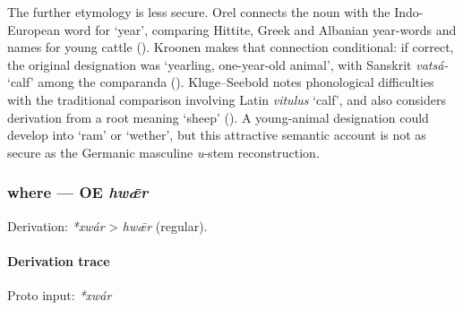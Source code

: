 \documentclass[
  british,
  a4paper,
]{article}
\begin{document}
The further etymology is less secure. Orel connects the noun with the
Indo-European word for `year', comparing Hittite, Greek and Albanian
year-words and names for young cattle (). Kroonen makes that connection conditional: if correct,
the original designation was `yearling, one-year-old animal', with
Sanskrit \emph{vatsá-} `calf' among the comparanda
(). Kluge--Seebold notes
phonological difficulties with the traditional comparison involving
Latin \emph{vitulus} `calf', and also considers derivation from a root
meaning `sheep' ().
A young-animal designation could develop into `ram' or `wether', but
this attractive semantic account is not as secure as the Germanic
masculine \emph{u}-stem reconstruction.

\subsubsection{\texorpdfstring{where --- OE
\emph{hwǣr}}{where --- OE hwǣr}}\label{where-oe-hwux1e3r}

Derivation: \emph{*xwár} \textgreater{} \emph{hwǣr} (regular).

\paragraph{Derivation trace}\label{derivation-trace-97}

Proto input: \emph{*xwár}

\begingroup
\setlength{\fboxsep}{6pt}
\end{document}
